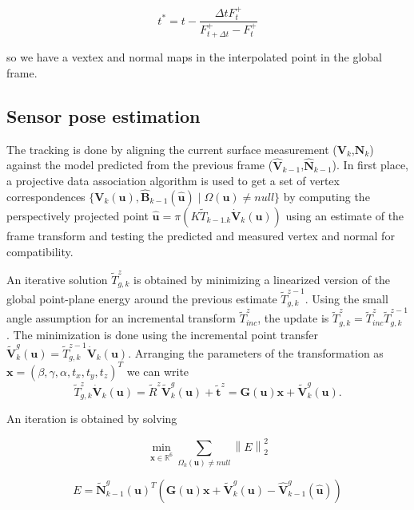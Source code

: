 \begin{equation}
t^* = t - \frac{\Delta t F^+_t}{F^+_{t+\Delta t} - F^+_t}
\end{equation}

so we have a vextex and normal maps in the interpolated point in the global frame.

\subsection{Sensor pose estimation}

The tracking is done by aligning the current surface measurement ($\mathbf{V}_k$,$\mathbf{N}_k$) against the model predicted from the previous frame ($\hat{\mathbf{V}}_{k-1}$,$\hat{\mathbf{N}}_{k-1}$).
In first place, a projective data association algorithm is used to get a set of vertex correspondences $\{ \mathbf{V}_k(\mathbf{u}), \hat{\mathbf{B}}_{k-1}(\hat{\mathbf{u}}) \mid \Omega(\mathbf{u}) \neq null \}$ by computing the perspectively projected point $\hat{\mathbf{u}} = \pi(K \tilde{T}_{k-1.k} \dot{\mathbf{V}}_k(\mathbf{u}))$ using an estimate of the frame transform and testing the predicted and measured vertex and normal for compatibility.

An iterative solution $\tilde{T}^z_{g,k}$ is obtained by minimizing a linearized version of the global point-plane energy around the previous estimate $\tilde{T}^{z-1}_{g,k}$. Using the small angle assumption for an incremental transform $\tilde{T}^z_{inc}$, the update is $\tilde{T}^z_{g,k} = \tilde{T}^z_{inc}\tilde{T}^{z-1}_{g,k}$.
The minimization is done using the incremental point transfer $\tilde{\mathbf{V}}^g_k(\mathbf{u}) = \tilde{T}^{z-1}_{g,k} \dot{\mathbf{V}}_k(\mathbf{u})$. 
Arranging the parameters of the transformation as $ \mathbf{x} = (\beta,\gamma,\alpha,t_x,t_y,t_z)^T$ we can write
\begin{equation}
\tilde{T}^z_{g,k} \dot{\mathbf{V}}_k(\mathbf{u}) = \tilde{R}^z \tilde{\mathbf{V}}^g_k(\mathbf{u}) + \tilde{\mathbf{t}}^z = \mathbf{G}(\mathbf{u})\mathbf{x} + \tilde{\mathbf{V}}^g_k(\mathbf{u}).
\end{equation}

An iteration is obtained by solving

\begin{equation}
\underset{\mathbf{x} \in  \mathbb{R}^6 }{\min} \sum_{\Omega_k (\mathbf{u}) \neq null} \left \| E \right \|^2_2
\end{equation}

\begin{equation}
 E = \tilde{\mathbf{N}}^g_{k-1}(\mathbf{u})^T \left( \mathbf{G}(\mathbf{u})\mathbf{x} + \tilde{\mathbf{V}}^g_k(\mathbf{u}) - \hat{\mathbf{V}}^g_{k-1}(\hat{\mathbf{u}}) \right)
\end{equation}

